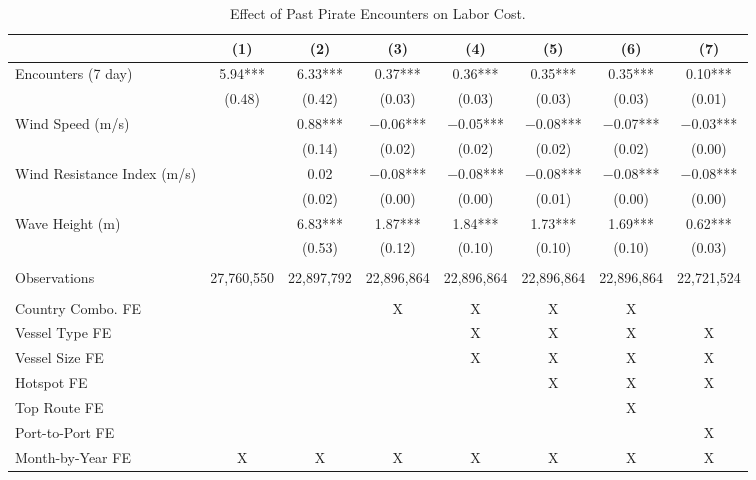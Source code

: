 \begin{table}
\centering
\caption{Effect of Past Pirate Encounters on Labor Cost. \label{tab:spec-labor-table-rev}}
\centering
\begin{adjustbox}{width = .9\textwidth}
\begin{threeparttable}
\begin{tabular}[t]{lccccccc}
\toprule
  & (1) & (2) & (3) & (4) & (5) & (6) & (7)\\
\midrule
Encounters (7 day) & \num{5.94}*** & \num{6.33}*** & \num{0.37}*** & \num{0.36}*** & \num{0.35}*** & \num{0.35}*** & \num{0.10}***\\
 & (\num{0.48}) & (\num{0.42}) & (\num{0.03}) & (\num{0.03}) & (\num{0.03}) & (\num{0.03}) & (\num{0.01})\\
Wind Speed (m/s) &  & \num{0.88}*** & \num{-0.06}*** & \num{-0.05}*** & \num{-0.08}*** & \num{-0.07}*** & \num{-0.03}***\\
 &  & (\num{0.14}) & (\num{0.02}) & (\num{0.02}) & (\num{0.02}) & (\num{0.02}) & (\num{0.00})\\
Wind Resistance Index (m/s) &  & \num{0.02} & \num{-0.08}*** & \num{-0.08}*** & \num{-0.08}*** & \num{-0.08}*** & \num{-0.08}***\\
 &  & (\num{0.02}) & (\num{0.00}) & (\num{0.00}) & (\num{0.01}) & (\num{0.00}) & (\num{0.00})\\
Wave Height (m) &  & \num{6.83}*** & \num{1.87}*** & \num{1.84}*** & \num{1.73}*** & \num{1.69}*** & \num{0.62}***\\
 &  & (\num{0.53}) & (\num{0.12}) & (\num{0.10}) & (\num{0.10}) & (\num{0.10}) & (\num{0.03})\\
 &  &  &  &  &  &  & \\
Observations & 27,760,550 & 22,897,792 & 22,896,864 & 22,896,864 & 22,896,864 & 22,896,864 & 22,721,524\\
 &  &  &  &  &  &  & \\
Country Combo. FE &  &  & X & X & X & X & \\
Vessel Type FE &  &  &  & X & X & X & X\\
Vessel Size FE &  &  &  & X & X & X & X\\
Hotspot FE &  &  &  &  & X & X & X\\
Top Route FE &  &  &  &  &  & X & \\
Port-to-Port FE &  &  &  &  &  &  & X\\
Month-by-Year FE & X & X & X & X & X & X & X\\
\bottomrule
\end{tabular}

\end{threeparttable}
\end{adjustbox}
\end{table}
